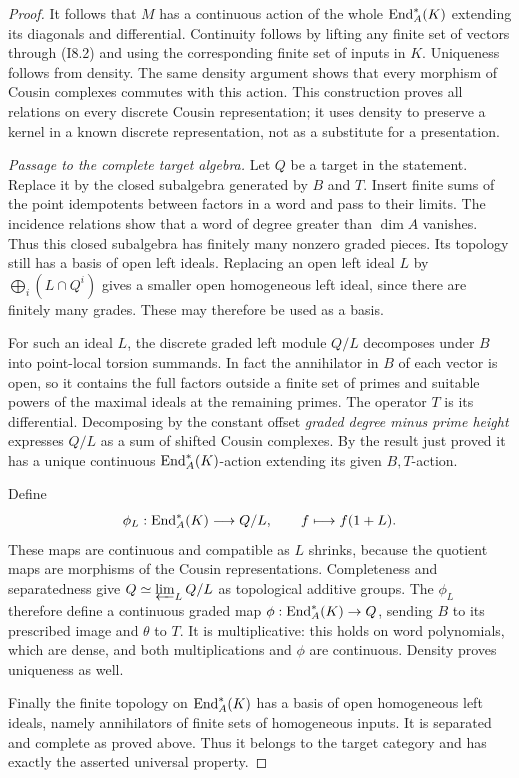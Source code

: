 \begin{proof}
It follows that $M$ has a continuous action of the whole
$\operatorname{End}_A^*(K)$ extending its diagonals and differential.
Continuity follows by lifting any finite set of vectors through
(I8.2) and using the corresponding finite set of inputs in $K$.
Uniqueness follows from density. The same density argument shows
that every morphism of Cousin complexes commutes with this action.
This construction proves all relations on every discrete Cousin
representation; it uses density to preserve a kernel in a known
discrete representation, not as a substitute for a presentation.

\emph{Passage to the complete target algebra.}
Let $Q$ be a target in the statement. Replace it by the closed
subalgebra generated by $B$ and $T$. Insert finite sums of the
point idempotents between factors in a word and pass to their
limits. The incidence relations show that a word of degree greater
than $\dim A$ vanishes. Thus this closed subalgebra has finitely
many nonzero graded pieces. Its topology still has a basis of open
left ideals. Replacing an open left ideal $L$ by
$\bigoplus_i(L\cap Q^i)$ gives a smaller open homogeneous left
ideal, since there are finitely many grades. These may therefore
be used as a basis.

For such an ideal $L$, the discrete graded left module $Q/L$
decomposes under $B$ into point-local torsion summands. In fact the
annihilator in $B$ of each vector is open, so it contains the full
factors outside a finite set of primes and suitable powers of the
maximal ideals at the remaining primes. The operator $T$ is its
differential. Decomposing by the constant offset
\emph{graded degree minus prime height} expresses $Q/L$ as a sum
of shifted Cousin complexes. By the result just proved it has a
unique continuous $\operatorname{End}_A^*(K)$-action extending its given
$B,T$-action.

Define
\[
 \phi_L:\operatorname{End}_A^*(K)\longrightarrow Q/L,
 \qquad f\longmapsto f(1+L).
\]
These maps are continuous and compatible as $L$ shrinks, because
the quotient maps are morphisms of the Cousin representations.
Completeness and separatedness give
$Q\simeq\varprojlim_L Q/L$ as topological additive groups.
The $\phi_L$ therefore define a continuous graded map
$\phi:\operatorname{End}_A^*(K)\to Q$, sending $B$ to its prescribed image
and $\theta$ to $T$. It is multiplicative: this holds on word
polynomials, which are dense, and both multiplications and $\phi$
are continuous. Density proves uniqueness as well.

Finally the finite topology on $\operatorname{End}_A^*(K)$ has a basis of open
homogeneous left ideals, namely annihilators of finite sets of
homogeneous inputs. It is separated and complete as proved above.
Thus it belongs to the target category and has exactly the asserted
universal property.
\end{proof}

